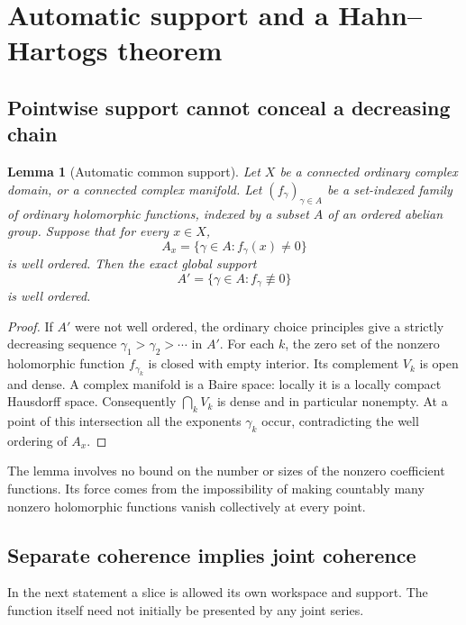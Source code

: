 \documentclass[11pt,oneside]{article}
\numberwithin{equation}{section}
\newtheorem{lemma}[theorem]{Lemma}
\theoremstyle{definition}
\theoremstyle{remark}\newtheorem{remark}[theorem]{Remark}
\begin{document}
\section{Automatic support and a Hahn--Hartogs theorem}\label{sec:hartogs}
\subsection{Pointwise support cannot conceal a decreasing chain}
\begin{lemma}[Automatic common support]\label{lem:autosupport}
Let \(X\) be a connected ordinary complex domain, or a connected complex manifold. Let \((f_\gamma)_{\gamma\in A}\) be a set-indexed family of ordinary holomorphic functions, indexed by a subset \(A\) of an ordered abelian group. Suppose that for every \(x\in X\),
\[
 A_x=\{\gamma\in A:f_\gamma(x)\ne0\}
\]
is well ordered. Then the exact global support
\[
 A'=\{\gamma\in A:f_\gamma\not\equiv0\}
\]
is well ordered.
\end{lemma}
\begin{proof}
If \(A'\) were not well ordered, the ordinary choice principles give a strictly decreasing sequence \(\gamma_1>\gamma_2>\cdots\) in \(A'\). For each \(k\), the zero set of the nonzero holomorphic function \(f_{\gamma_k}\) is closed with empty interior. Its complement \(V_k\) is open and dense. A complex manifold is a Baire space: locally it is a locally compact Hausdorff space. Consequently \(\bigcap_k V_k\) is dense and in particular nonempty. At a point of this intersection all the exponents \(\gamma_k\) occur, contradicting the well ordering of \(A_x\).
\end{proof}

The lemma involves no bound on the number or sizes of the nonzero coefficient functions. Its force comes from the impossibility of making countably many nonzero holomorphic functions vanish collectively at every point.

\subsection{Separate coherence implies joint coherence}
In the next statement a slice is allowed its own workspace and support. The function itself need not initially be presented by any joint series.
\end{document}
